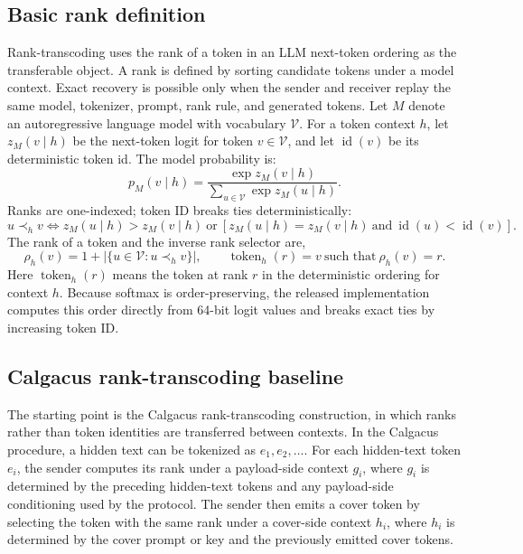 \documentclass[fleqn,10pt]{wlscirep}
\begin{document}
\subsection*{Basic rank definition}\label{sec:rank-method}

Rank-transcoding uses the rank of a token in an LLM next-token ordering as the transferable object. A rank is defined by sorting candidate tokens under a model context. Exact recovery is possible only when the sender and receiver replay the same model, tokenizer, prompt, rank rule, and generated tokens.
Let \(M\) denote an autoregressive language model with vocabulary \(\mathcal{V}\). For a token context \(h\), let \(z_M(v\mid h)\) be the next-token logit for token \(v\in\mathcal{V}\), and let \(\operatorname{id}(v)\) be its deterministic token id. The model probability is:
\begin{equation}
p_M(v\mid h)=
\frac{\exp z_M(v\mid h)}{\sum_{u\in\mathcal V}\exp z_M(u\mid h)}.
\label{eq:next-token-prob}
\end{equation}
Ranks are one-indexed; token ID breaks ties deterministically:
\begin{equation}
u \prec_h v
\Longleftrightarrow
z_M(u\mid h)>z_M(v\mid h)
\ \text{or}\
\left[z_M(u\mid h)=z_M(v\mid h)\ \text{and}\ \operatorname{id}(u)<\operatorname{id}(v)\right].
\label{eq:rank-order}
\end{equation}
The rank of a token and the inverse rank selector are,
\begin{equation}
\rho_h(v)=1+\left|\{u\in\mathcal V:u\prec_h v\}\right|,
\qquad
\operatorname{token}_h(r)=v\ \text{such that}\ \rho_h(v)=r.
\label{eq:rank-function}
\end{equation}
Here \(\operatorname{token}_h(r)\) means the token at rank \(r\) in the deterministic ordering for context \(h\). Because softmax is order-preserving, the released implementation computes this order directly from 64-bit logit values and breaks exact ties by increasing token ID.

\subsection*{Calgacus rank-transcoding baseline}\label{sec:calgacus-method}

The starting point is the Calgacus rank-transcoding construction, in which ranks rather than token identities are transferred between contexts\cite{NorelliBronstein2026Calgacus}. In the Calgacus procedure, a hidden text can be tokenized as \(e_1,e_2,\ldots\). For each hidden-text token \(e_i\), the sender computes its rank under a payload-side context \(g_i\), where \(g_i\) is determined by the preceding hidden-text tokens and any payload-side conditioning used by the protocol. The sender then emits a cover token by selecting the token with the same rank under a cover-side context \(h_i\), where \(h_i\) is determined by the cover prompt or key and the previously emitted cover tokens.
\end{document}
